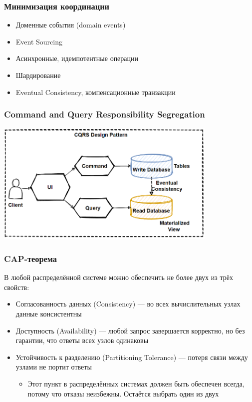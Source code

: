 \documentclass{../mcsslides}
\begin{document}
    \begin{frame}
        \frametitle{Минимизация координации}
        \begin{itemize}
            \item Доменные события (domain events)
            \item Event Sourcing
            \item Асинхронные, идемпотентные операции
            \item Шардирование
            \item Eventual Consistency, компенсационные транзакции
        \end{itemize}
    \end{frame}

    \begin{frame}
        \frametitle{Command and Query Responsibility Segregation}
        \begin{center}
            \includegraphics[width=0.8\textwidth]{cqrs.png}
        \end{center}
    \end{frame}

    \begin{frame}
        \frametitle{CAP-теорема}
        В любой распределённой системе можно обеспечить не более двух из трёх свойств:
        \begin{itemize}
            \item Согласованность данных (Consistency) --- во всех вычислительных узлах данные консистентны
            \item Доступность (Availability) --- любой запрос завершается корректно, но без гарантии, что ответы всех узлов одинаковы
            \item Устойчивость к разделению (Partitioning Tolerance) --- потеря связи между узлами не портит ответы
            \begin{itemize}
                \item Этот пункт в распределённых системах должен быть обеспечен всегда, потому что отказы неизбежны. Остаётся выбрать один из двух
            \end{itemize}
        \end{itemize}
    \end{frame}
\end{document}
